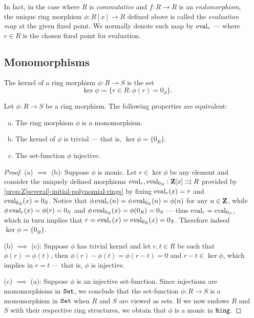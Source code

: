 In fact, in the case where \(R\) is \emph{commutative} and \(f: R \to R\) is an
\emph{endomorphism}, the unique ring morphism \(\phi: R[x] \to R\) defined above
is called the \emph{evaluation map} at the given fixed point. We normally denote
such map by \(\operatorname{eval}_r\) --- where \(r \in R\) is the chosen fixed point for
evaluation.

\subsection{Monomorphisms}

%
\begin{definition}[Kernel]
    \label{def:ring-morphism-kernel}
    The kernel of a ring morphism \(\phi: R \to S\) is the set
    \[
        \ker \phi \coloneq \{r \in R \colon \phi(r) = 0_S\}.
    \]
\end{definition}
%

%
\begin{proposition}
    \label{prop:ring-kernel-monomorphism-injective}
    Let \(\phi: R \to S\) be a ring morphism. The following properties are
    equivalent:
    \begin{enumerate}[(a)]\setlength\itemsep{0em}
        \item The ring morphism \(\phi\) is a monomorphism.

        \item The kernel of \(\phi\) is trivial --- that is, \(\ker \phi = \{0_R\}\).

        \item The set-function \(\phi\) injective.
    \end{enumerate}
\end{proposition}
%

%
\begin{proof}
    (a) \(\implies\) (b): Suppose \(\phi\) is monic. Let \(r \in \ker \phi\) be any
    element and consider the uniquely defined morphisms
    \(\operatorname{eval}_r, \operatorname{eval}_{0_R}: \mathbf{Z}[x] \rightrightarrows R\) provided by
    \cref{prop:Z[several]-initial-polynomial-rings} by fixing \(\operatorname{eval}_r(x) = r\) and
    \(\operatorname{eval}_{0_R}(x) = 0_S\). Notice that
    \(\phi \operatorname{eval}_r(n) = \phi \operatorname{eval}_{0_R}(n) = \phi(n)\) for any \(n \in \mathbf{Z}\), while
    \(\phi \operatorname{eval}_r(x) = \phi(r) = 0_S\) and
    \(\phi \operatorname{eval}_{0_R}(x) = \phi(0_R) = 0_S\) --- thus \(\operatorname{eval}_r = \operatorname{eval}_{0_S}\),
    which in turn implies that \(r = \operatorname{eval}_r(x) = \operatorname{eval}_{0_R}(x) = 0_S\). Therefore
    indeed \(\ker \phi = \{0_R\}\).

    (b) \(\implies\) (c): Suppose \(\phi\) has trivial kernel and let \(r, t \in R\)
    be such that \(\phi(r) = \phi(t)\), then \(\phi(r) - \phi(t) = \phi(r - t) = 0\)
    and \(r - t \in \ker \phi\), which implies in \(r = t\) --- that is, \(\phi\) is
    injective.

    (c) \(\implies\) (a): Suppose \(\phi\) is an injective set-function. Since
    injections are monomorphisms in \({\texttt{Set}}\), we conclude that the set-function
    \(\phi: R \to S\) is a monomorphism in \({\texttt{Set}}\) when \(R\) and \(S\) are viewed
    as sets. If we now endows \(R\) and \(S\) with their respective ring structures,
    we obtain that \(\phi\) is a monic in \({\texttt{Ring}}\).
\end{proof}
%

